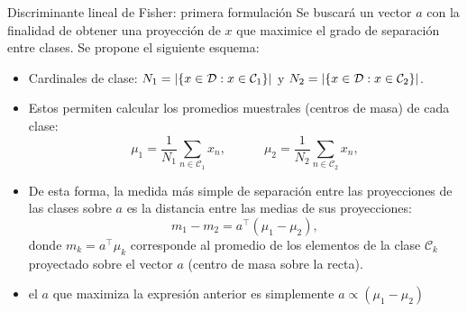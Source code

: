 \documentclass[9pt, handout]{beamer}
\begin{document}
\begin{frame}{Discriminante lineal de Fisher: primera formulación}
Se buscará un vector $a$ con la finalidad de obtener una proyección de $x$ que maximice el grado de separación entre clases. Se propone el siguiente esquema:\pause

\begin{itemize}
	\item Cardinales de clase: $N_1 = |\{x\in{\mathcal D}:x\in{\mathcal C}_1\}|$ y $N_2 = |\{x\in{\mathcal D}:x\in{\mathcal C}_2\}|$.\pause
	\item Estos permiten calcular los promedios muestrales (centros de masa) de cada clase: 
\begin{equation*}
	\mu_1=\frac{1}{N_1}\sum_{n\in\mathcal{C}_1}x_n,
	\quad\quad\quad
	\mu_2=\frac{1}{N_2}\sum_{n\in\mathcal{C}_2}x_n,
\end{equation*}
\pause
	\item De esta forma, la medida más simple de separación entre las proyecciones de las clases sobre $a$ es la distancia entre las medias  de sus proyecciones:
\begin{equation*}
	m_1 - m_2 = a^\top(\mu_1-\mu_2),
\end{equation*}
donde $m_k= a^\top\mu_k$ corresponde al promedio de los elementos de  la clase $\mathcal{C}_k$ proyectado sobre el  vector $a$ (centro de masa sobre la recta).
	\item el $a$  que maximiza la expresión anterior es simplemente $a\propto (\mu_1-\mu_2)$
\end{itemize}

\end{frame}
\end{document}
